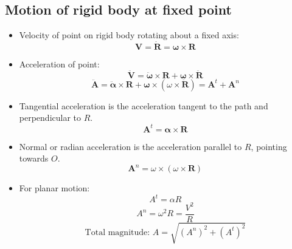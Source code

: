 \documentclass[11pt]{article}
\begin{document}
\subsection{Motion of rigid body at fixed point}
\label{sec:org84f766c}
\begin{itemize}
\item Velocity of point on rigid body rotating about a fixed axis:
\[\boldsymbol{V} = \dot{\boldsymbol{R}} = \boldsymbol{\omega} \times \boldsymbol{R}\]
\item Acceleration of point:
\[\ddot{\boldsymbol{V}} = \ddot{\boldsymbol{\omega}} \times \boldsymbol{R} + \boldsymbol{\omega} \times \ddot{\boldsymbol{R}}\]
\[\ddot{\boldsymbol{A}} = \ddot{\boldsymbol{\alpha}} \times \boldsymbol{R} + \boldsymbol{\omega} \times (\omega \times \ddot{\boldsymbol{R}}) = \boldsymbol{A}^t + \boldsymbol{A}^n\]
\item Tangential acceleration is the acceleration tangent to the path and perpendicular to \(R\).
\[\boldsymbol{A}^t = \boldsymbol{\alpha} \times \boldsymbol{R}\]
\item Normal or radian acceleration is the acceleration parallel to \(R\), pointing towards \(O\).
\[\boldsymbol{A}^n = \omega \times (\omega \times \boldsymbol{R})\]
\item For planar motion:
\[A^t = \alpha R\]
\[A^n = \omega^2 R = \frac{V^2}{R}\]
\[\text{Total magnitude: } A = \sqrt{(A^n)^2 + (A^t)^2}\]
\end{itemize}

 \newpage
\end{document}
